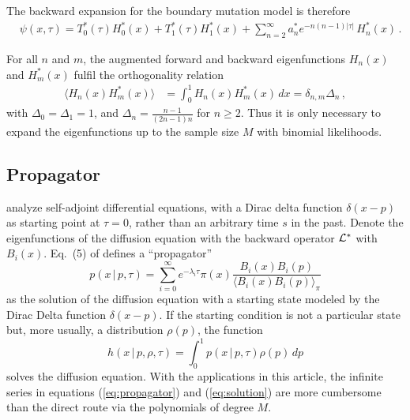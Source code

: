 \documentclass[preprint]{elsarticle}
\newcommand\given{{\,|\,}}
\begin{document}
The backward expansion for the boundary mutation model is therefore
\begin{equation}\label{eq:backw_expansion_boundary}
\begin{split}
    &\psi(x,\tau)=T_0^{*}(\tau)H_0^{*}(x)+ T_1^{*}(\tau)H_1^{*}(x)+\sum_{n=2}^\infty a_n^{*} e^{-n(n-1) |\tau|}\,H_n^{*}(x)\,.
\end{split}
\end{equation}

For all $n$ and $m$, the augmented forward and backward eigenfunctions $H_n(x)$ and $H_m^{*}(x)$ fulfil the orthogonality relation 
\begin{equation}
\begin{split}
    \langle H_n(x)H_m^{*}(x)\rangle&= \int_0^1 H_n(x)H_m^{*}(x)\,dx=\delta_{n,m}\Delta_n\,,
\end{split}
\end{equation}
with $\Delta_0=\Delta_1=1$, and $\Delta_n=\frac{n-1}{(2n-1)n}$ for $n\geq 2$. Thus it is only necessary to expand the eigenfunctions up to the sample size $M$ with binomial likelihoods. 

\subsection{Propagator}\label{section:Greens_function}

\citet{Song12} analyze self-adjoint differential equations, with a Dirac delta function $\delta(x-p)$ as starting point at $\tau=0$, rather than an arbitrary time $s$ in the past. Denote the eigenfunctions of the diffusion equation with the backward operator $\cal{L}^*$ with $B_i(x)$. Eq.~(5) of \citet{Song12} defines a ``propagator'' \citep[][chap.~19]{Bayi06}
\begin{equation}\label{eq:propagator}
    p(x\given p,\tau)=\sum_{i=0}^\infty e^{-\lambda_i \tau}\pi(x) \frac{B_i(x)B_i(p)}{\langle B_i(x)B_i(p) \rangle_{\pi}}
\end{equation}
as the solution of the diffusion equation with a starting state modeled by the Dirac Delta function $\delta(x-p)$. If the starting condition is not a particular state but, more usually, a distribution $\rho(p)$, the function
\begin{equation}\label{eq:solution}
    h(x\given p,\rho,\tau)=\int_0^1 p(x\given p,\tau)\rho(p)\,dp
\end{equation}
solves the diffusion equation. With the applications in this article, the infinite series in equations (\ref{eq:propagator}) and (\ref{eq:solution}) are more cumbersome than the direct route via the polynomials of degree $M$. 
\end{document}
